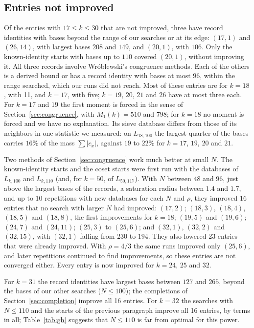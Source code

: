 \documentclass[11pt]{amsart}
\theoremstyle{definition}
\theoremstyle{remark}
\begin{document}
\subsection{Entries not improved}\label{sec:notimproved}
Of the \NumNotImproved{} entries with $17\le k\le30$ that are not improved, three have record
identities with bases beyond the range of our searches or at its edge: $(17,1)$ and $(26,14)$,
with largest bases $208$ and $149$, and $(20,1)$, with $106$. Only the known-identity starts
with bases up to $110$ covered $(20,1)$, without improving it. All three records involve
Wr\'oblewski's congruence methods. Each of the others is a derived bound or has a record identity
with bases at most $96$, within the range searched, which our runs did not reach. Most of these
entries are for $k=18$, with 11, and $k=17$, with five; $k=19$, $20$, $21$ and $26$ have at most
three each. For $k=17$ and $19$ the first moment is forced in the sense of
Section~\ref{sec:congruence}, with $M_1(k)=510$ and $798$; for $k=18$ no moment is forced and we
have no explanation. Its sieve database differs from those of its neighbors in one statistic we
measured: on $L_{18,100}$ the largest quarter of the bases carries $16\%$ of the mass
$\sum|c_x|$, against $19$ to $22\%$ for $k=17$, $19$, $20$ and $21$.

Two methods of Section~\ref{sec:congruence} work much better at small $N$. The known-identity
starts and the coset starts were first run with the databases of $L_{k,100}$ and $L_{k,110}$
(and, for $k=50$, of $L_{50,117}$). With $N$ between $48$ and $96$, just above the largest bases
of the records, a saturation radius between $1.4$ and $1.7$, and up to 10 repetitions with new
databases for each $N$ and $\rho$, they improved 16 entries that no search with larger $N$ had
improved: $(17,2)$; $(18,3)$, $(18,4)$, $(18,5)$ and $(18,8)$, the first improvements for $k=18$;
$(19,5)$ and $(19,6)$; $(24,7)$ and $(24,11)$; $(25,3)$ to $(25,6)$; and $(32,1)$, $(32,2)$ and
$(32,15)$, with $(32,1)$ falling from $230$ to $194$. They also lowered 23 entries that were
already improved. With $\rho=4/3$ the same runs improved only $(25,6)$, and later repetitions
continued to find improvements, so these entries are not converged either. Every entry is now
improved for $k=24$, $25$ and $32$.

For $k=31$ the record identities have largest bases between $127$ and $265$, beyond the bases
of our other searches ($N\le100$); the completions of Section~\ref{sec:completion} improve all 16
entries. For $k=32$ the searches with $N\le110$ and the starts of the previous paragraph improve
all 16 entries, by \KThirtyTwoSaved{} terms in all; Table~\ref{tab:gh} suggests that
$N\le110$ is far from optimal for this power.
\end{document}

